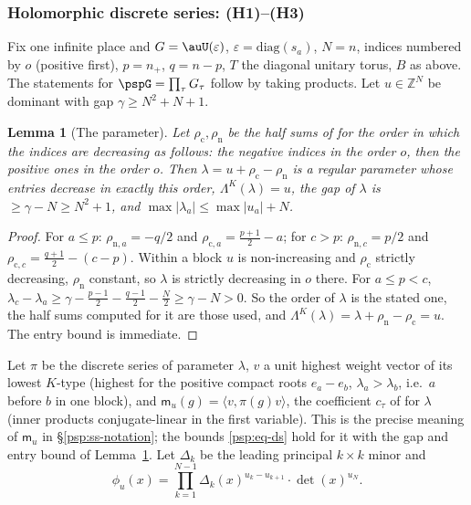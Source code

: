 \documentclass[10pt]{amsart}
\newtheorem{lemma}[theorem]{Lemma}
\theoremstyle{definition}
\theoremstyle{remark}
\newcommand{\Z}{\mathbb Z}
\begin{document}
\subsubsection{Holomorphic discrete series: (H1)--(H3)}\label{psq:ss-H3}

Fix one infinite place and $G=\auU(\varepsilon)$, $\varepsilon=\mathrm{diag}(s_a)$, $N=n$, indices
numbered by $o$ (positive first), $p=n_+$, $q=n-p$, $T$ the diagonal unitary torus, $B$ as above. The
statements for $\pspG=\prod_\tau G_\tau$ follow by taking products. Let $u\in\Z^N$ be dominant with
gap $\gamma\ge N^2+N+1$.

\begin{lemma}[The parameter]\label{psq:param}
Let $\rho_{\mathrm c},\rho_{\mathrm n}$ be the half sums of {\cite[\S5.1]{P51}} for the order
in which the indices are decreasing as follows: the negative indices in the order $o$, then the
positive ones in the order $o$. Then $\lambda=u+\rho_{\mathrm c}-\rho_{\mathrm n}$ is a regular
parameter whose entries decrease in exactly this order, $\Lambda^K(\lambda)=u$, the gap of $\lambda$ is
$\ge\gamma-N\ge N^2+1$, and $\max|\lambda_a|\le\max|u_a|+N$.
\end{lemma}
\begin{proof}
For $a\le p$: $\rho_{\mathrm n,a}=-q/2$ and $\rho_{\mathrm c,a}=\frac{p+1}2-a$; for $c>p$:
$\rho_{\mathrm n,c}=p/2$ and $\rho_{\mathrm c,c}=\frac{q+1}2-(c-p)$. Within a block $u$ is
non-increasing and $\rho_{\mathrm c}$ strictly decreasing, $\rho_{\mathrm n}$ constant, so $\lambda$ is
strictly decreasing in $o$ there. For $a\le p<c$, $\lambda_c-\lambda_a\ge\gamma-\frac{p-1}2-\frac{q-1}2-
\frac N2\ge\gamma-N>0$. So the order of $\lambda$ is the stated one, the half sums computed for it are
those used, and $\Lambda^K(\lambda)=\lambda+\rho_{\mathrm n}-\rho_{\mathrm c}=u$. The entry bound is
immediate.
\end{proof}

\noindent Let $\pi$ be the discrete series of parameter $\lambda$, $v$ a unit highest weight vector
of its lowest $K$-type (highest for the positive compact roots $e_a-e_b$, $\lambda_a>\lambda_b$,
i.e.\ $a$ before $b$ in one block), and $\mathsf m_u(g)=\langle v,\pi(g)v\rangle$, the coefficient
$c_\tau$ of {\cite[\S5]{P51}} for $\lambda$ (inner products conjugate-linear in the first variable).
This is the precise meaning of $\mathsf m_u$ in \S\ref{psp:ss-notation}; the bounds
\eqref{psp:eq-ds} hold for it with the gap and entry bound of Lemma~\ref{psq:param}. Let
$\Delta_k$ be the leading principal $k\times k$ minor and
\[
\phi_u(x)=\prod_{k=1}^{N-1}\Delta_k(x)^{u_k-u_{k+1}}\cdot\det(x)^{u_N}.
\]
\end{document}
